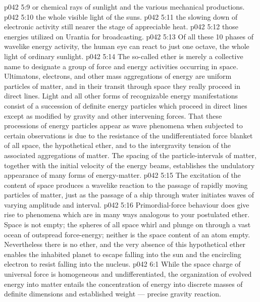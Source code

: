 \vs p042 5:9 \bibnobreakspace {} or chemical rays of sunlight and the various mechanical productions.
\vs p042 5:10 \bibnobreakspace {} the whole visible light of the suns.
\vs p042 5:11 \bibnobreakspace {} the slowing down of electronic activity still nearer the stage of appreciable heat.
\vs p042 5:12 \bibnobreakspace {} those energies utilized on Urantia for broadcasting.
\vs p042 5:13 \pc Of all these 10 phases of wavelike energy activity, the human eye can react to just one octave, the whole light of ordinary sunlight.
\vs p042 5:14 \pc The so\hyp{}called ether is merely a collective name to designate a group of force and energy activities occurring in space. Ultimatons, electrons, and other mass aggregations of energy are uniform particles of matter, and in their transit through space they really proceed in direct lines. Light and all other forms of recognizable energy manifestations consist of a succession of definite energy particles which proceed in direct lines except as modified by gravity and other intervening forces. That these processions of energy particles appear as wave phenomena when subjected to certain observations is due to the resistance of the undifferentiated force blanket of all space, the hypothetical ether, and to the intergravity tension of the associated aggregations of matter. The spacing of the particle\hyp{}intervals of matter, together with the initial velocity of the energy beams, establishes the undulatory appearance of many forms of energy\hyp{}matter.
\vs p042 5:15 The excitation of the content of space produces a wavelike reaction to the passage of rapidly moving particles of matter, just as the passage of a ship through water initiates waves of varying amplitude and interval.
\vs p042 5:16 Primordial\hyp{}force behaviour does give rise to phenomena which are in many ways analogous to your postulated ether. Space is not empty; the spheres of all space whirl and plunge on through a vast ocean of outspread force\hyp{}energy; neither is the space content of an atom empty. Nevertheless there is no ether, and the very absence of this hypothetical ether enables the inhabited planet to escape falling into the sun and the encircling electron to resist falling into the nucleus.
\vs p042 6:1 While the space charge of universal force is homogeneous and undifferentiated, the organization of evolved energy into matter entails the concentration of energy into discrete masses of definite dimensions and established weight --- precise gravity reaction.
